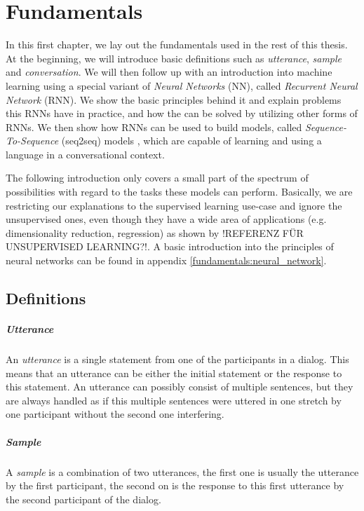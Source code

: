 \chapter{Fundamentals}
\label{chapter:fundamental}
In this first chapter, we lay out the fundamentals used in the rest of this thesis. At the beginning, we will introduce basic definitions such as \emph{utterance}, \emph{sample} and \emph{conversation}. We will then follow up with an introduction into machine learning using a special variant of \emph{Neural Networks} (NN), called \emph{Recurrent Neural Network} (RNN). We show the basic principles behind it and explain problems this RNNs have in practice, and how the can be solved by utilizing other forms of RNNs. We then show how RNNs can be used to build models, called \emph{Sequence-To-Sequence} (seq2seq) models \cite{Sutskever:2014}, which are capable of learning and using a language in a conversational context.

The following introduction only covers a small part of the spectrum of possibilities with regard to the tasks these models can perform. Basically, we are restricting our explanations to the supervised learning use-case and ignore the unsupervised ones, even though they have a wide area of applications (e.g. dimensionality reduction, regression) as shown by !REFERENZ FÜR UNSUPERVISED LEARNING?!. A basic introduction into the principles of neural networks can be found in appendix \ref{fundamentals:neural_network}.

\section{Definitions}
\paragraph{Utterance} An \emph{utterance} is a single statement from one of the participants in a dialog. This means that an utterance can be either the initial statement or the response to this statement. An utterance can possibly consist of multiple sentences, but they are always handled as if this multiple sentences were uttered in one stretch by one participant without the second one interfering.
\paragraph{Sample} A \emph{sample} is a combination of two utterances, the first one is usually the utterance by the first participant, the second on is the response to this first utterance by the second participant of the dialog.
